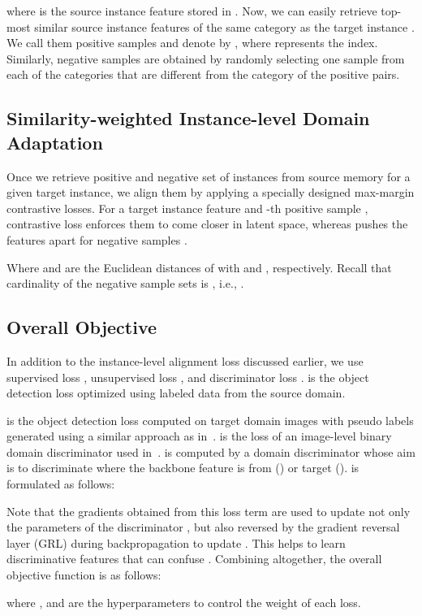 \documentclass{bmvc2k}
\begin{document}
where  is the  source instance feature stored in .
Now, we can easily retrieve top- most similar source instance features of the same category as the target instance .
We call them positive samples and denote by , where  represents the index. Similarly, negative samples  are obtained by randomly selecting 
one sample from each of the categories that are different from the category of the positive pairs. 

\subsection{Similarity-weighted Instance-level Domain Adaptation} \label{sec:alignment}
Once we retrieve positive and negative set of instances from source memory for a given target instance, we align them by applying a specially designed max-margin contrastive losses. 
For a target instance feature  and -th positive sample , contrastive loss enforces them to come closer in latent space, whereas pushes the features apart for negative samples .


Where  and  are the Euclidean distances of  with  and , respectively. Recall that cardinality of the negative sample sets is , i.e., .


\subsection{Overall Objective}\label{sec:overall loss}
In addition to the instance-level alignment loss discussed earlier, we use supervised loss , unsupervised loss , and discriminator loss .
 is the object detection loss optimized using labeled data from the source domain.
 
is the object detection loss computed on target domain images with pseudo labels generated using a similar approach as in~\cite{li2022cross}.
 is the loss of an image-level binary domain discriminator used in~\cite{he2019multi, xie2019multi}.
 is computed by a domain discriminator  whose aim is to discriminate where the backbone feature is from () or target (). 
 is formulated as follows:

Note that the gradients obtained from this loss term are used to update not only the parameters of the discriminator , but also reversed by the gradient reversal layer (GRL) during backpropagation to update . This helps  to learn discriminative features that can confuse .
Combining altogether, the overall objective function is as follows:

where ,  and  are the hyperparameters to control the weight of each loss.
\end{document}
